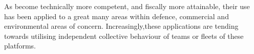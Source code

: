 As  become technically more competent, and fiscally more attainable, their use has been applied to a great many areas within defence, commercial and environmental areas of concern. 
Increasingly,these applications are tending towards utilising  independent collective behaviour of teams or fleets of these platforms.
